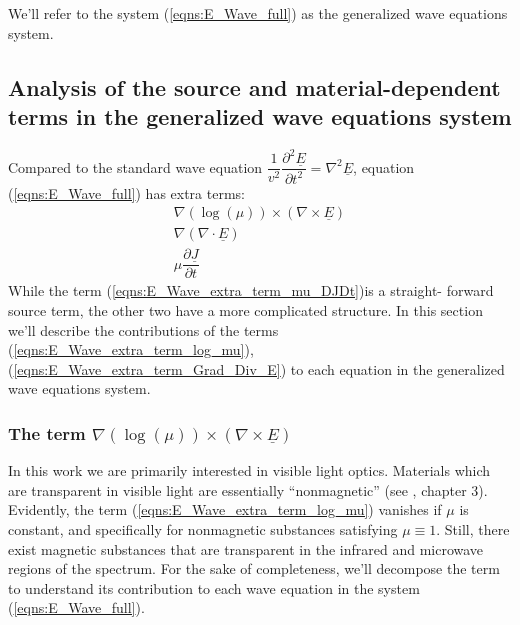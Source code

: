\documentclass[12pt,twoside]{article}
\begin{document}
We'll refer to the system (\ref{eqns:E_Wave_full}) as the generalized wave equations system.


\subsection{Analysis of the source and material-dependent terms in the generalized wave equations system}

Compared to the standard wave equation $\dfrac{1}{v^2}\dfrac{\partial ^2\underline{E}}{\partial t^2} =  \nabla^2 \underline{E}$, equation (\ref{eqns:E_Wave_full}) has extra terms:
\begin{subequations}
\begin{align}
\nabla \left( \log (\mu) \right) \times \left(\nabla \times \underline{E} \right) \label{eqns:E_Wave_extra_term_log_mu}\\
\nabla (\nabla \cdot \underline{E}) \label{eqns:E_Wave_extra_term_Grad_Div_E} \\
\mu \dfrac{\partial \underline{J}}{\partial t} \label{eqns:E_Wave_extra_term_mu_DJDt} 
\end{align}
\end{subequations}
While the term (\ref{eqns:E_Wave_extra_term_mu_DJDt})is a straight- forward source term, the other two have a more complicated structure. In this section we'll describe the contributions of the terms (\ref{eqns:E_Wave_extra_term_log_mu}), (\ref{eqns:E_Wave_extra_term_Grad_Div_E}) to each equation in the generalized wave equations system.

\subsubsection{The term $\nabla \left( \log (\mu) \right) \times \left(\nabla \times \underline{E} \right)$}

In this work we are primarily interested in visible light optics. Materials which are transparent in visible light are essentially ``nonmagnetic'' (see \cite{Hecht2002}, chapter 3). Evidently, the term (\ref{eqns:E_Wave_extra_term_log_mu}) vanishes if $\mu$ is constant, and specifically for nonmagnetic substances satisfying $\mu \equiv 1$. Still, there exist magnetic substances that are transparent in the infrared and microwave regions of the spectrum. For the sake of completeness, we'll decompose the term to understand its contribution to each wave equation in  the system (\ref{eqns:E_Wave_full}).\\
\end{document}
